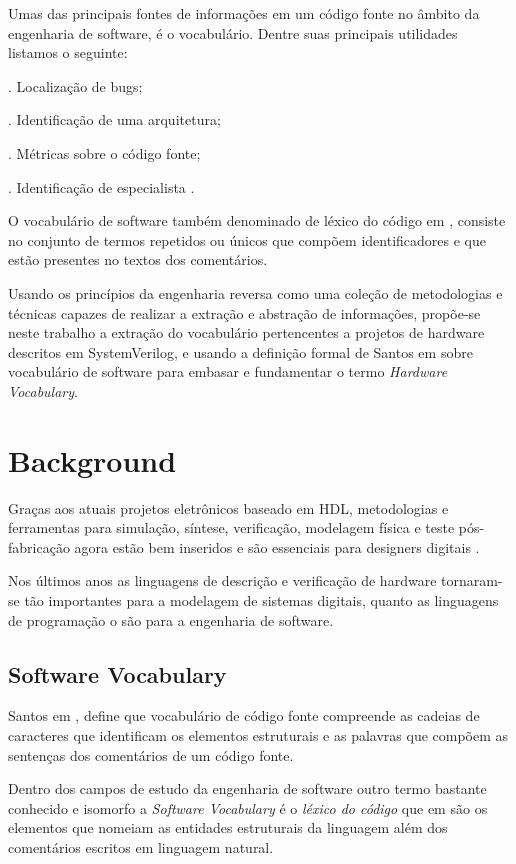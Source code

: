 \documentclass[12pt, twocolumn, a4paper]{article}
\begin{document}
Umas das principais fontes de informações em um código fonte no âmbito da engenharia de software, é o vocabulário. Dentre suas principais utilidades listamos o seguinte:

. Localização de bugs;

. Identificação de uma arquitetura;

. Métricas sobre o código fonte;

. Identificação de especialista \cite{Santos2015}.

O vocabulário de software também denominado de léxico do código em \cite{Biggers2011}, consiste no conjunto de termos repetidos ou únicos que compõem identificadores e que estão presentes no textos dos comentários\cite{Abebe2009}.

Usando os princípios da engenharia reversa como uma coleção de metodologias e técnicas capazes de realizar a extração e abstração de informações\cite{Santos2009}, propõe-se neste trabalho a extração do vocabulário pertencentes a projetos de hardware descritos em SystemVerilog, e usando a definição formal de Santos em \cite{Santos2015} sobre vocabulário de software para embasar e fundamentar o termo \textit{Hardware Vocabulary}. 

	\section{Background}
\quad Graças aos atuais projetos eletrônicos baseado em HDL, metodologias e ferramentas para simulação, síntese, verificação, modelagem física e teste pós-fabricação agora estão bem inseridos e são essenciais para designers digitais \cite{Navabi2015}. 

Nos últimos anos as linguagens de descrição e verificação de hardware tornaram-se tão importantes para a modelagem de sistemas digitais, quanto as linguagens de programação o são para a engenharia de software. 
	
	\subsection{Software Vocabulary}
\quad Santos em \cite{Santos2009}, define que vocabulário de código fonte compreende as cadeias de caracteres que identificam os elementos estruturais e as palavras que compõem as sentenças dos comentários de um código fonte. 

Dentro dos campos de estudo da engenharia de software outro termo bastante conhecido e isomorfo a \textit{Software Vocabulary} é o \textit{léxico do código} que em \cite{Biggers2011} são os elementos que nomeiam as entidades estruturais da linguagem além dos comentários escritos em linguagem natural.
\end{document}

